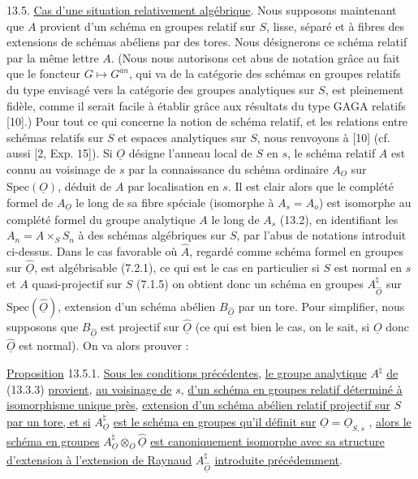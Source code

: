 13.5. \underline{Cas d'une situation relativement algébrique}. Nous supposons maintenant que $A$ provient d'un schéma en groupes relatif sur $S$, lisse, séparé et à fibres des extensions de schémas abéliens par des tores. Nous désignerons ce schéma relatif par la même lettre $A$. (Nous nous autorisons cet abus de notation grâce au fait que le foncteur $G \longmapsto G^{an}$, qui va de la catégorie des schémas en groupes relatifs du type envisagé vers la catégorie des groupes analytiques sur $S$, est pleinement fidèle, comme il serait facile à établir grâce aux résultats du type GAGA relatifs [10].) Pour tout ce qui concerne la notion de schéma relatif, et les relations entre schémas relatifs sur $S$ et espaces analytiques sur $S$, nous renvoyons à [10] (cf. aussi [2, Exp. 15]). Si $\underline{O}$ désigne l'anneau local de $S$ en $s$, le schéma relatif $A$ est connu au voisinage de $s$ par la connaissance du schéma ordinaire $A_{\underline{O}}$ sur $\mathrm{Spec}(\underline{O})$, déduit de $A$ par localisation en $s$. Il est clair alors que le complété formel de $A_{\underline{O}}$ le long de sa fibre spéciale (isomorphe à $A_s = A_o$) est isomorphe au complété formel du groupe analytique $A$ le long de $A_s$ (13.2), en identifiant les $A_n = A \times_S S_n$ à des schémas algébriques sur $S$, par l'abus de notations introduit ci-dessus. Dans le cas favorable où $\hat{A}$, regardé comme schéma formel en groupes sur $\hat{\underline{O}}$, est algébrisable (7.2.1), ce qui est le cas en particulier si $S$ est normal en $s$ et $A$ quasi-projectif sur $S$ (7.1.5) on obtient donc un schéma en groupes $A^\natural_{\hat{\underline{O}}}$ sur $\mathrm{Spec}(\hat{\underline{O}})$, extension d'un schéma abélien $B_{\hat{\underline{O}}}$ par un tore. Pour simplifier, nous supposons que $B_{\hat{\underline{O}}}$ est projectif sur $\hat{\underline{O}}$ (ce qui est bien le cas, on le sait, si $\underline{O}$ donc $\hat{\underline{O}}$ est normal). On va alors prouver :



\underline{Proposition} 13.5.1. \underline{Sous les conditions précédentes}, \underline{le groupe analytique} $A^\natural$ \underline{de} (13.3.3) \underline{provient}, \underline{au voisinage de} $s$, \underline{d'un schéma en groupes relatif déterminé à isomorphisme unique près}, \underline{extension d'un schéma abélien relatif projectif sur} $S$ \underline{par un tore, et si} $A^\natural_{\underline{O}}$ \underline{est le schéma en groupes qu'il définit sur} $\underline{O} = \underline{O}_{S,s}$ , \underline{alors le schéma en groupes} $A^\natural_{\underline{O}} \otimes_{\underline{O}} \hat{\underline{O}}$ \underline{est canoniquement isomorphe avec sa structure d'extension à l'extension de Raynaud} $A^\natural_{\hat{\underline{O}}}$ \underline{introduite précédemment}.

